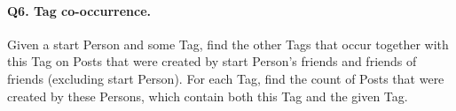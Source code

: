 \paragraph{\textbf{Q6}. Tag co-occurrence.}
Given a start Person and some Tag, find the other Tags that occur
together with this Tag on Posts that were created by start Person's
friends and friends of friends (excluding start Person). For each
Tag, find the count of Posts that were created by these Persons, which
contain both this Tag and the given Tag.
